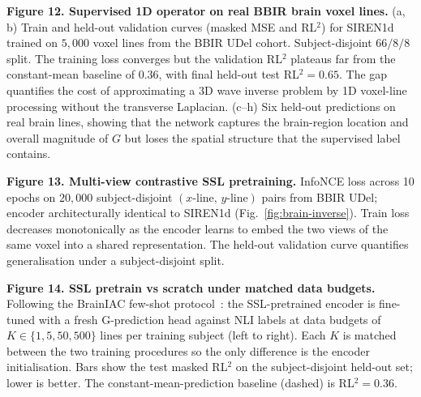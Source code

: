\documentclass[11pt,letterpaper]{article}
\begin{document}
\textbf{Figure 12. Supervised 1D operator on real BBIR brain voxel
lines.}
(a, b) Train and held-out validation curves (masked MSE and RL$^{2}$)
for SIREN1d trained on $5{,}000$ voxel lines from the BBIR UDel
cohort. Subject-disjoint $66/8/8$ split. The training loss converges
but the validation RL$^{2}$ plateaus far from the constant-mean
baseline of $0.36$, with final held-out test RL$^{2}=0.65$. The
gap quantifies the cost of approximating a 3D wave inverse problem
by 1D voxel-line processing without the transverse Laplacian.
(c--h) Six held-out predictions on real brain lines, showing that
the network captures the brain-region location and overall magnitude
of $G$ but loses the spatial structure that the supervised label
contains.

\textbf{Figure 13. Multi-view contrastive SSL pretraining.}
InfoNCE loss across 10 epochs on $20{,}000$ subject-disjoint
$(x\text{-line},\,y\text{-line})$ pairs from BBIR UDel; encoder
architecturally identical to SIREN1d (Fig.~\ref{fig:brain-inverse}).
Train loss decreases monotonically as the encoder learns to embed
the two views of the same voxel into a shared representation. The
held-out validation curve quantifies generalisation under a
subject-disjoint split.

\textbf{Figure 14. SSL pretrain vs scratch under matched data budgets.}
Following the BrainIAC few-shot protocol~\cite{tak2026brainiac}: the
SSL-pretrained encoder is fine-tuned with a fresh G-prediction head
against NLI labels at data budgets of $K\in\{1, 5, 50, 500\}$ lines
per training subject (left to right). Each $K$ is matched between
the two training procedures so the only difference is the encoder
initialisation. Bars show the test masked RL$^{2}$ on the
subject-disjoint held-out set; lower is better. The
constant-mean-prediction baseline (dashed) is RL$^{2}=0.36$.


\end{document}

